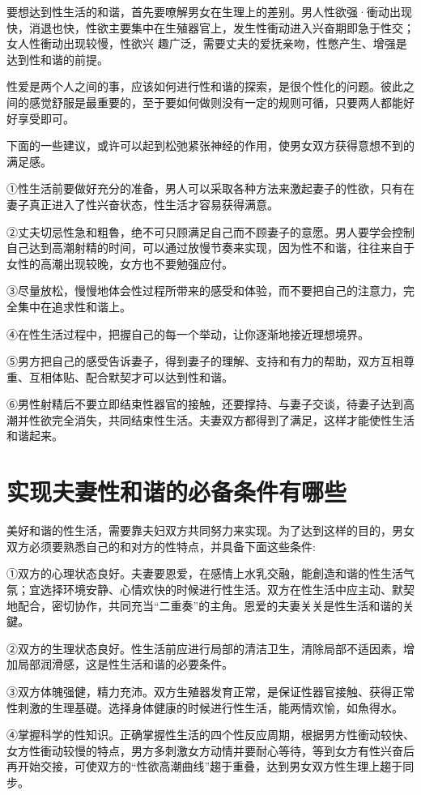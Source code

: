 \documentclass[12pt,UTF8]{ctexbook}
\begin{document}
要想达到性生活的和谐，首先要嘹解男女在生理上的差别。男人性欲强·衝动出现快，消退也快，性欲主要集中在生殖器官上，发生性衝动进入兴奋期即急于性交；女人性衝动出现较慢，性欲兴
趣广泛，需要丈夫的爱抚亲吻，性憋产生、增强是达到性和谐的前提。

性爱是两个人之间的事，应该如何进行性和谐的探索，是很个性化的问题。彼此之间的感觉舒服是最重要的，至于要如何做则没有一定的规则可循，只要两人都能好好享受即可。

下面的一些建议，或许可以起到松弛紧张神经的作用，使男女双方获得意想不到的满足感。

①性生活前要做好充分的准备，男人可以采取各种方法来激起妻子的性欲，只有在妻子真正进入了性兴奋状态，性生活才容易获得满意。

②丈夫切忌性急和粗魯，绝不可只顾满足自己而不顾妻子的意愿。男人要学会控制自己达到高潮射精的时间，可以通过放慢节奏来实现，因为性不和谐，往往来自于女性的高潮出现较晚，女方也不要勉强应付。

③尽量放松，慢慢地体会性过程所带来的感受和体验，而不要把自己的注意力，完全集中在追求性和谐上。

④在性生活过程中，把握自己的每一个举动，让你逐渐地接近理想境界。

⑤男方把自己的感受告诉妻子，得到妻子的理解、支持和有力的帮助，双方互相尊重、互相体贴、配合默契才可以达到性和谐。

⑥男性射精后不要立即结束性器官的接触，还要撑持、与妻子交谈，待妻子达到高潮并性欲完全消失，共同结束性生活。夫妻双方都得到了满足，这样才能使性生活和谐起来。

\section{实现夫妻性和谐的必备条件有哪些}

美好和谐的性生活，需要靠夫妇双方共同努力来实现。为了达到这样的目的，男女双方必须要熟悉自己的和对方的性特点，并具备下面这些条件:

①双方的心理状态良好。夫妻要恩爱，在感情上水乳交融，能創造和谐的性生活气氛；宜选择环境安静、心情欢快的时候进行性生活。双方在性生活中应主动、默契地配合，密切协作，共同充当“二重奏”的主角。恩爱的夫妻关关是性生活和谐的关鍵。

②双方的生理状态良好。性生活前应进行局部的清洁卫生，清除局部不适因素，增加局部润滑感，这是性生活和谐的必要条件。

③双方体魄强健，精力充沛。双方生殖器发育正常，是保证性器官接触、获得正常性刺激的生理基礎。选择身体健康的时候进行性生活，能两情欢愉，如魚得水。

④掌握科学的性知识。正确掌握性生活的四个性反应周期，根据男方性衝动较快、女方性衝动较慢的特点，男方多刺激女方动情并要耐心等待，等到女方有性兴奋后再开始交接，可使双方的“性欲高潮曲线”趨于重叠，达到男女双方性生理上趨于同步。
\end{document}
